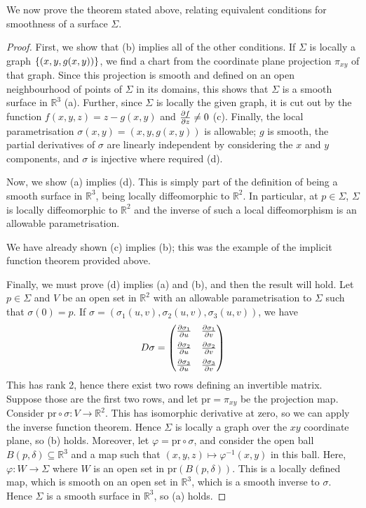 \documentclass[a4paper,11pt]{article}
\begin{document}
We now prove the theorem stated above, relating equivalent conditions for smoothness of a surface \( \Sigma \).
\begin{proof}
	First, we show that (b) implies all of the other conditions.
	If \( \Sigma \) is locally a graph \( \qty{(x,y,g(x,y))} \), we find a chart from the coordinate plane projection \( \pi_{xy} \) of that graph.
	Since this projection is smooth and defined on an open neighbourhood of points of \( \Sigma \) in its domains, this shows that \( \Sigma \) is a smooth surface in \( \mathbb R^3 \) (a).
	Further, since \( \Sigma \) is locally the given graph, it is cut out by the function \( f(x,y,z) = z - g(x,y) \) and \( \pdv{f}{z} \neq 0 \) (c).
	Finally, the local parametrisation \( \sigma(x,y) = (x,y,g(x,y)) \) is allowable; \( g \) is smooth, the partial derivatives of \( \sigma \) are linearly independent by considering the \( x \) and \( y \) components, and \( \sigma \) is injective where required (d).

	Now, we show (a) implies (d).
	This is simply part of the definition of being a smooth surface in \( \mathbb R^3 \), being locally diffeomorphic to \( \mathbb R^2 \).
	In particular, at \( p \in \Sigma \), \( \Sigma \) is locally diffeomorphic to \( \mathbb R^2 \) and the inverse of such a local diffeomorphism is an allowable parametrisation.

	We have already shown (c) implies (b); this was the example of the implicit function theorem provided above.

	Finally, we must prove (d) implies (a) and (b), and then the result will hold.
	Let \( p \in \Sigma \) and \( V \) be an open set in \( \mathbb R^2 \) with an allowable parametrisation to \( \Sigma \) such that \( \sigma(0) = p \).
	If \( \sigma = (\sigma_1(u,v), \sigma_2(u,v), \sigma_3(u,v)) \), we have
	\[
		D\sigma = \begin{pmatrix}
			\pdv{\sigma_1}{u} & \pdv{\sigma_1}{v} \\[.5em]
			\pdv{\sigma_2}{u} & \pdv{\sigma_2}{v} \\[.5em]
			\pdv{\sigma_3}{u} & \pdv{\sigma_3}{v}
		\end{pmatrix}
	\]
	This has rank 2, hence there exist two rows defining an invertible matrix.
	Suppose those are the first two rows, and let \( \mathrm{pr} = \pi_{xy} \) be the projection map.
	Consider \( \mathrm{pr} \circ \sigma \colon V \to \mathbb R^2 \).
	This has isomorphic derivative at zero, so we can apply the inverse function theorem.
	Hence \( \Sigma \) is locally a graph over the \( xy \) coordinate plane, so (b) holds.
	Moreover, let \( \varphi = \mathrm{pr} \circ \sigma \), and consider the open ball \( B(p, \delta) \subseteq \mathbb R^3 \) and a map such that \( (x,y,z) \mapsto \varphi^{-1}(x,y) \) in this ball.
	Here, \( \varphi \colon W \to \Sigma \) where \( W \) is an open set in \( \mathrm{pr}(B(p, \delta)) \).
	This is a locally defined map, which is smooth on an open set in \( \mathbb R^3 \), which is a smooth inverse to \( \sigma \).
	Hence \( \Sigma \) is a smooth surface in \( \mathbb R^3 \), so (a) holds.
\end{proof}
\end{document}

